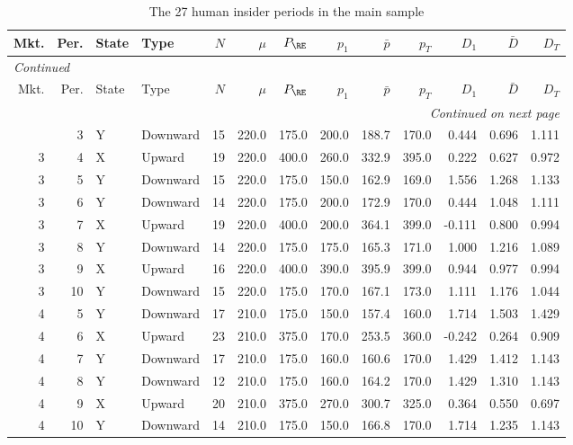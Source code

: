 \tiny
\begin{longtable}{rrllrrrrrrrrr}
\caption{The 27 human insider periods in the main sample}\label{tab:app-human-main}\\
\toprule
Mkt. & Per. & State & Type & $N$ & $\mu$ & $P_{\RE}$ & $p_1$ & $\bar p$ & $p_T$ & $D_1$ & $\bar D$ & $D_T$ \\
\midrule
\endfirsthead
\multicolumn{13}{l}{\textit{Continued}}\\
\toprule
Mkt. & Per. & State & Type & $N$ & $\mu$ & $P_{\RE}$ & $p_1$ & $\bar p$ & $p_T$ & $D_1$ & $\bar D$ & $D_T$ \\
\midrule
\endhead
\midrule
\multicolumn{13}{r}{\textit{Continued on next page}}\\
\endfoot
\bottomrule
\endlastfoot
3 & 3 & Y & Downward & 15 & 220.0 & 175.0 & 200.0 & 188.7 & 170.0 & 0.444 & 0.696 & 1.111 \\
3 & 4 & X & Upward & 19 & 220.0 & 400.0 & 260.0 & 332.9 & 395.0 & 0.222 & 0.627 & 0.972 \\
3 & 5 & Y & Downward & 15 & 220.0 & 175.0 & 150.0 & 162.9 & 169.0 & 1.556 & 1.268 & 1.133 \\
3 & 6 & Y & Downward & 14 & 220.0 & 175.0 & 200.0 & 172.9 & 170.0 & 0.444 & 1.048 & 1.111 \\
3 & 7 & X & Upward & 19 & 220.0 & 400.0 & 200.0 & 364.1 & 399.0 & -0.111 & 0.800 & 0.994 \\
3 & 8 & Y & Downward & 14 & 220.0 & 175.0 & 175.0 & 165.3 & 171.0 & 1.000 & 1.216 & 1.089 \\
3 & 9 & X & Upward & 16 & 220.0 & 400.0 & 390.0 & 395.9 & 399.0 & 0.944 & 0.977 & 0.994 \\
3 & 10 & Y & Downward & 15 & 220.0 & 175.0 & 170.0 & 167.1 & 173.0 & 1.111 & 1.176 & 1.044 \\
4 & 5 & Y & Downward & 17 & 210.0 & 175.0 & 150.0 & 157.4 & 160.0 & 1.714 & 1.503 & 1.429 \\
4 & 6 & X & Upward & 23 & 210.0 & 375.0 & 170.0 & 253.5 & 360.0 & -0.242 & 0.264 & 0.909 \\
4 & 7 & Y & Downward & 17 & 210.0 & 175.0 & 160.0 & 160.6 & 170.0 & 1.429 & 1.412 & 1.143 \\
4 & 8 & Y & Downward & 12 & 210.0 & 175.0 & 160.0 & 164.2 & 170.0 & 1.429 & 1.310 & 1.143 \\
4 & 9 & X & Upward & 20 & 210.0 & 375.0 & 270.0 & 300.7 & 325.0 & 0.364 & 0.550 & 0.697 \\
4 & 10 & Y & Downward & 14 & 210.0 & 175.0 & 150.0 & 166.8 & 170.0 & 1.714 & 1.235 & 1.143 \\

\end{longtable}
